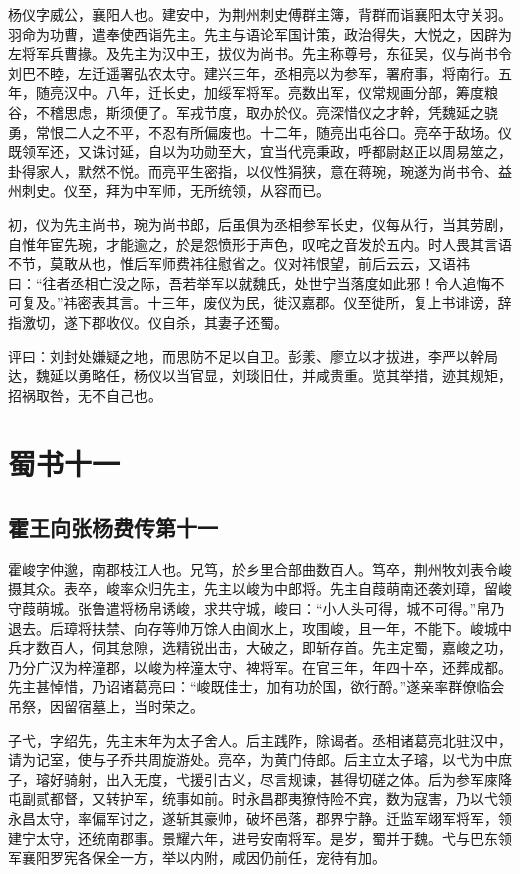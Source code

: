 \documentclass[12pt,UTF8]{ctexbook}
\begin{document}
杨仪字威公，襄阳人也。建安中，为荆州刺史傅群主簿，背群而诣襄阳太守关羽。羽命为功曹，遣奉使西诣先主。先主与语论军国计策，政治得失，大悦之，因辟为左将军兵曹掾。及先主为汉中王，拔仪为尚书。先主称尊号，东征吴，仪与尚书令刘巴不睦，左迁遥署弘农太守。建兴三年，丞相亮以为参军，署府事，将南行。五年，随亮汉中。八年，迁长史，加绥军将军。亮数出军，仪常规画分部，筹度粮谷，不稽思虑，斯须便了。军戎节度，取办於仪。亮深惜仪之才幹，凭魏延之骁勇，常恨二人之不平，不忍有所偏废也。十二年，随亮出屯谷口。亮卒于敌场。仪既领军还，又诛讨延，自以为功勋至大，宜当代亮秉政，呼都尉赵正以周易筮之，卦得家人，默然不悦。而亮平生密指，以仪性狷狭，意在蒋琬，琬遂为尚书令、益州刺史。仪至，拜为中军师，无所统领，从容而已。

初，仪为先主尚书，琬为尚书郎，后虽俱为丞相参军长史，仪每从行，当其劳剧，自惟年宦先琬，才能逾之，於是怨愤形于声色，叹咤之音发於五内。时人畏其言语不节，莫敢从也，惟后军师费祎往慰省之。仪对祎恨望，前后云云，又语祎曰：“往者丞相亡没之际，吾若举军以就魏氏，处世宁当落度如此邪！令人追悔不可复及。”祎密表其言。十三年，废仪为民，徙汉嘉郡。仪至徙所，复上书诽谤，辞指激切，遂下郡收仪。仪自杀，其妻子还蜀。

评曰：刘封处嫌疑之地，而思防不足以自卫。彭羕、廖立以才拔进，李严以幹局达，魏延以勇略任，杨仪以当官显，刘琰旧仕，并咸贵重。览其举措，迹其规矩，招祸取咎，无不自己也。

\part{蜀书十一}
\chapter{霍王向张杨费传第十一}

霍峻字仲邈，南郡枝江人也。兄笃，於乡里合部曲数百人。笃卒，荆州牧刘表令峻摄其众。表卒，峻率众归先主，先主以峻为中郎将。先主自葭萌南还袭刘璋，留峻守葭萌城。张鲁遣将杨帛诱峻，求共守城，峻曰：“小人头可得，城不可得。”帛乃退去。后璋将扶禁、向存等帅万馀人由阆水上，攻围峻，且一年，不能下。峻城中兵才数百人，伺其怠隙，选精锐出击，大破之，即斩存首。先主定蜀，嘉峻之功，乃分广汉为梓潼郡，以峻为梓潼太守、裨将军。在官三年，年四十卒，还葬成都。先主甚悼惜，乃诏诸葛亮曰：“峻既佳士，加有功於国，欲行酹。”遂亲率群僚临会吊祭，因留宿墓上，当时荣之。

子弋，字绍先，先主末年为太子舍人。后主践阼，除谒者。丞相诸葛亮北驻汉中，请为记室，使与子乔共周旋游处。亮卒，为黄门侍郎。后主立太子璿，以弋为中庶子，璿好骑射，出入无度，弋援引古义，尽言规谏，甚得切磋之体。后为参军庲降屯副贰都督，又转护军，统事如前。时永昌郡夷獠恃险不宾，数为寇害，乃以弋领永昌太守，率偏军讨之，遂斩其豪帅，破坏邑落，郡界宁静。迁监军翊军将军，领建宁太守，还统南郡事。景耀六年，进号安南将军。是岁，蜀并于魏。弋与巴东领军襄阳罗宪各保全一方，举以内附，咸因仍前任，宠待有加。
\end{document}
